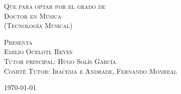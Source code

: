 \documentclass[11pt]{article}
\begin{document}
\begin{titlepage}
\begin{center}
                     \vfill                                                                   
           {\scshape\large Que para optar por el grado de\\
             Doctor en Música\\
             (Tecnología Musical)\\\par}                                        
\vspace{0.5cm}                                                                                                                                                                        
    {\scshape\large Presenta\\
      Emilio Ocelotl Reyes\\
      Tutor principal: Hugo Solís García\\
      Comité Tutor: Iracema e Andrade, Fernando Monreal\par}                                                                                                                                            
\vspace{0.5cm}                                                                                                                                                                  
    {\large \today \par}

    \end{center}                                                              

                                                                          
\end{titlepage}                                                                                                                                                               
\end{document}
